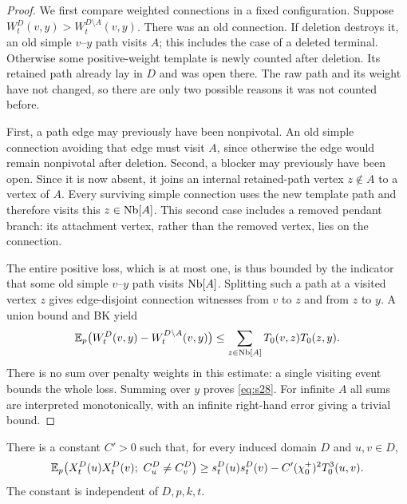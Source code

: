 \begin{proof}
We first compare weighted connections in a fixed configuration.  Suppose
$W_t^D(v,y)>W_t^{D\setminus A}(v,y)$.  There was an old connection.  If
deletion destroys it, an old simple $v$--$y$ path visits $A$; this includes
the case of a deleted terminal.  Otherwise some positive-weight template
is newly counted after deletion.  Its retained path already lay in $D$ and
was open there.  The raw path and its weight have not changed, so there are
only two possible reasons it was not counted before.

First, a path edge may previously have been nonpivotal.  An old simple
connection avoiding that edge must visit $A$, since otherwise the edge
would remain nonpivotal after deletion.  Second, a blocker may previously
have been open.  Since it is now absent, it joins an internal retained-path
vertex $z\notin A$ to a vertex of $A$.  Every surviving simple connection
uses the new template path and therefore visits this
$z\in\operatorname{Nb}[A]$.  This second case includes a removed pendant branch: its
attachment vertex, rather than the removed vertex, lies on the connection.

The entire positive loss, which is at most one, is thus bounded by the
indicator that some old simple $v$--$y$ path visits $\operatorname{Nb}[A]$.  Splitting
such a path at a visited vertex $z$ gives edge-disjoint connection
witnesses from $v$ to $z$ and from $z$ to $y$.  A union bound and BK yield
\[
 \mathbb E_p\bigl(W_t^D(v,y)-W_t^{D\setminus A}(v,y)\bigr)
 \le\sum_{z\in\operatorname{Nb}[A]}T_0(v,z)T_0(z,y).
\]
There is no sum over penalty weights in this estimate: a single visiting
event bounds the whole loss.  Summing over $y$ proves \eqref{eq:s28}.
For infinite $A$ all sums are interpreted monotonically, with an infinite
right-hand error giving a trivial bound.
\end{proof}

\begin{lemma}\label{def:correlation}
There is a constant $C'>0$ such that, for every induced domain $D$ and
$u,v\in D$,
\begin{equation}\label{eq:s29}
 \mathbb E_p\bigl(X_t^D(u)X_t^D(v);\ C_u^D\ne C_v^D\bigr)
 \ge s_t^D(u)s_t^D(v)-C'(\chi_0^+)^2T_0^3(u,v).
\end{equation}
The constant is independent of $D,p,k,t$.
\end{lemma}


